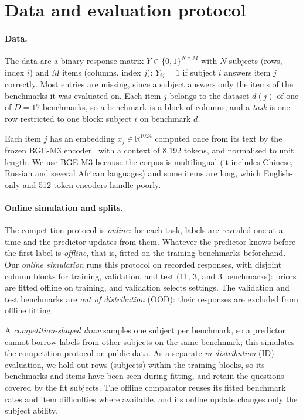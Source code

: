 \section{Data and evaluation protocol}
\label{sec:setting-online}
\paragraph{Data.} The data are a binary response matrix $Y\in\{0,1\}^{N\times M}$ with $N$ subjects (rows, index $i$) and $M$ items (columns, index $j$): $Y_{ij}=1$ if subject $i$ answers item $j$ correctly. Most entries are missing, since a subject answers only the items of the benchmarks it was evaluated on. Each item $j$ belongs to the dataset $d(j)$ of one of $D=17$ benchmarks, so a benchmark is a block of columns, and a \emph{task} is one row restricted to one block: subject $i$ on benchmark $d$.

Each item $j$ has an embedding $x_j\in\mathbb R^{1024}$ computed once from its text by the frozen BGE-M3 encoder~\citep{chen2024bge} with a context of 8,192 tokens, and normalised to unit length. We use BGE-M3 because the corpus is multilingual (it includes Chinese, Russian and several African languages) and some items are long, which English-only and 512-token encoders handle poorly.

\paragraph{Online simulation and splits.} The competition protocol is \emph{online}: for each task, labels are revealed one at a time and the predictor updates from them. Whatever the predictor knows before the first label is \emph{offline}, that is, fitted on the training benchmarks beforehand. Our \emph{online simulation} runs this protocol on recorded responses, with disjoint column blocks for training, validation, and test (11, 3, and 3 benchmarks): priors are fitted offline on training, and validation selects settings. The validation and test benchmarks are \emph{out of distribution} (OOD): their responses are excluded from offline fitting.

A \emph{competition-shaped draw} samples one subject per benchmark, so a predictor cannot borrow labels from other subjects on the same benchmark; this simulates the competition protocol on public data. As a separate \emph{in-distribution} (ID) evaluation, we hold out rows (subjects) within the training blocks, so its benchmarks and items have been seen during fitting, and retain the questions covered by the fit subjects. The offline comparator reuses its fitted benchmark rates and item difficulties where available, and its online update changes only the subject ability.


